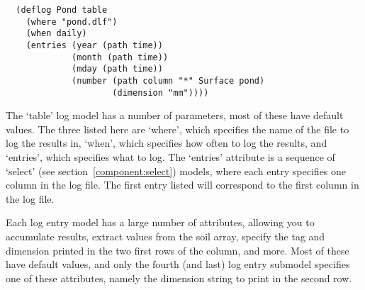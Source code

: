 \begin{verbatim}
  (deflog Pond table
    (where "pond.dlf")
    (when daily)
    (entries (year (path time))
             (month (path time))
             (mday (path time))
             (number (path column "*" Surface pond)
                     (dimension "mm"))))
\end{verbatim}

The `table' log model has a number of parameters, most of these have
default values.  The three listed here are `where', which specifies
the name of the file to log the results in, `when', which specifies
how often to log the results, and `entries', which specifies what to
log.  The `entries' attribute is a sequence of `select' (see
section~\ref{component:select}) models, where each entry specifies one
column in the log file.  The first entry listed will correspond to the
first column in the log file.

Each log entry model has a large number of attributes, allowing you
to accumulate results, extract values from the soil array, specify the
tag and dimension printed in the two first rows of the column, and
more.  Most of these have default values, and only the fourth (and
last) log entry submodel specifies one of these attributes, namely the
dimension string to print in the second row.

